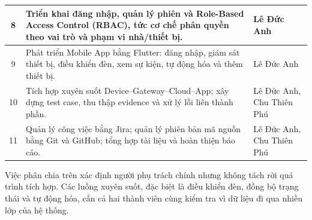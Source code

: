 \begin{table}[H]
\begin{tabular}{|c|>{\raggedright\arraybackslash}p{9.2cm}|>{\centering\arraybackslash}p{3.4cm}|}
8 & Triển khai đăng nhập, quản lý phiên và Role-Based Access Control (RBAC), tức cơ chế phân quyền theo vai trò và phạm vi nhà/thiết bị. & Lê Đức Anh \\ \hline
9 & Phát triển Mobile App bằng Flutter: đăng nhập, giám sát thiết bị, điều khiển đèn, xem sự kiện, tự động hóa và thêm thiết bị. & Lê Đức Anh \\ \hline
10 & Tích hợp xuyên suốt Device--Gateway--Cloud--App; xây dựng test case, thu thập evidence và xử lý lỗi liên thành phần. & Lê Đức Anh, Chu Thiên Phú \\ \hline
11 & Quản lý công việc bằng Jira; quản lý phiên bản mã nguồn bằng Git và GitHub; tổng hợp tài liệu và hoàn thiện báo cáo. & Lê Đức Anh, Chu Thiên Phú \\ \hline
\end{tabular}
\setlength{\tabcolsep}{6pt}
\end{table}

Việc phân chia trên xác định người phụ trách chính nhưng không tách rời quá trình tích hợp. Các luồng xuyên suốt, đặc biệt là điều khiển đèn, đồng bộ trạng thái và tự động hóa, cần cả hai thành viên cùng kiểm tra vì dữ liệu đi qua nhiều lớp của hệ thống.

\newpage
